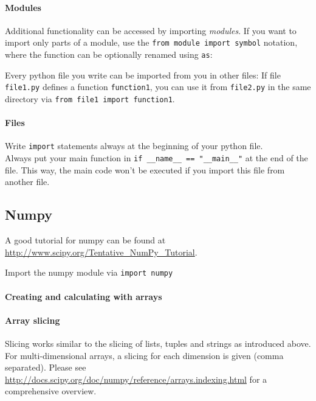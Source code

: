 \documentclass{../uebungsblatt}
\begin{document}
\paragraph{Modules}
Additional functionality can be accessed by importing \emph{modules}.
If you want to import only parts of a module, use the
\lstinline!from module import symbol! notation, where the function
can be optionally renamed using \lstinline!as!:
\vspace*{-0.5em}

\vspace*{-1.0em}
Every python file you write can be imported from you in other files:
If file \texttt{file1.py} defines a function \texttt{function1},
you can use it from \texttt{file2.py} in the same directory via
\texttt{from file1 import function1}.

\paragraph{Files}
Write \lstinline!import! statements always at the beginning of your python
file.\\
Always put your main function in \lstinline!if __name__ == "__main__"! at
the end of the file. This way, the main code won't be executed if you import
this file from another file.

\subsection*{Numpy}

A good tutorial for numpy can be found at
\url{http://www.scipy.org/Tentative_NumPy_Tutorial}.

Import the numpy module via \lstinline!import numpy!

\paragraph{Creating and calculating with arrays}
\vspace*{0.25em}

\vspace*{-1.0em}

\paragraph{Array slicing}
Slicing works similar to the slicing of lists, tuples and strings as introduced
above. For multi-dimensional arrays, a slicing for each dimension is given
(comma separated).
Please see \url{http://docs.scipy.org/doc/numpy/reference/arrays.indexing.html}
for a comprehensive overview.
\vspace*{-1em}

\vspace*{-1.0em}
\end{document}
